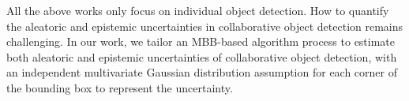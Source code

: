 All the above works only focus on individual object detection. How to quantify the aleatoric and epistemic uncertainties in collaborative object detection remains challenging. In our work, we tailor an MBB-based algorithm process to estimate both aleatoric and epistemic uncertainties of collaborative object detection, with an independent multivariate Gaussian distribution assumption for each corner of the bounding box to represent the uncertainty.




